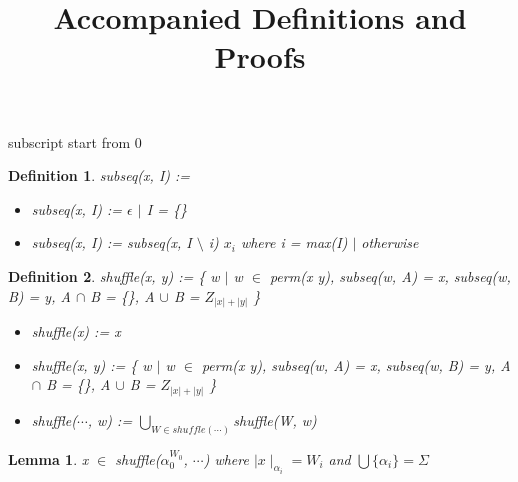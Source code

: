 \documentclass[12pt]{article}
\title{Accompanied Definitions and Proofs}
\newtheorem{definition}{Definition}
\newtheorem{lemma}{Lemma}
\begin{document}
subscript start from 0



\begin{definition} subseq(x, I) :=
\begin{itemize}
\item[•]subseq(x, I) := $\epsilon$ $\mid$ I = \{\}
\item[•]subseq(x, I) := subseq(x, I $\setminus$ i) $x_{i}$ where i = max(I) $\mid$ otherwise
\end{itemize}
\end{definition}


\begin{definition} shuffle(x, y) := \{ w $\mid$ w $\in$ perm(x y), subseq(w, A) = x, subseq(w, B) = y, A $\cap$ B = \{\}, A $\cup$ B = $Z_{|x|+|y|}$ \}
\begin{itemize}
\item[•]shuffle(x) := x
\item[•]shuffle(x, y) := \{ w $\mid$ w $\in$ perm(x y), subseq(w, A) = x, subseq(w, B) = y, A $\cap$ B = \{\}, A $\cup$ B = $Z_{|x|+|y|}$ \}
\item[•]shuffle($\cdots$, w) := $\bigcup_{W \in shuffle(\cdots)}$shuffle(W, w)
\end{itemize}
\end{definition}

\begin{lemma}
x $\in$ shuffle($\alpha_{0}^{W_{0}}$, $\cdots$) where $\mid x \mid_{\alpha_{i}}=W_{i}$ and $\bigcup\{ \alpha_{i} \} = \Sigma$
\end{lemma}
\end{document}
